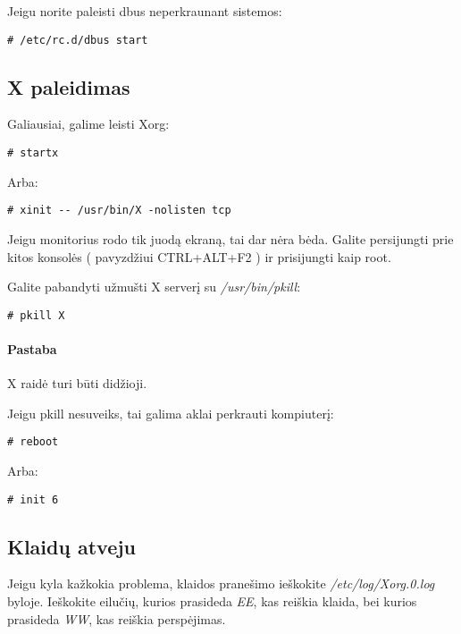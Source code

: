       Jeigu norite paleisti dbus neperkraunant sistemos:

      \begin{verbatim}
# /etc/rc.d/dbus start
      \end{verbatim}

    \subsection{X paleidimas}

      Galiausiai, galime leisti Xorg:

      \begin{verbatim}
# startx
      \end{verbatim}

      Arba:

      \begin{verbatim}
# xinit -- /usr/bin/X -nolisten tcp
      \end{verbatim}

      Jeigu monitorius rodo tik juodą ekraną, tai dar nėra
      bėda. Galite persijungti prie kitos konsolės ( pavyzdžiui
      CTRL+ALT+F2 ) ir prisijungti kaip root.

      Galite pabandyti užmušti X serverį su \textsl{/usr/bin/pkill}:

      \begin{verbatim}
# pkill X
      \end{verbatim}

      \paragraph{Pastaba} X raidė turi būti didžioji.

      Jeigu pkill nesuveiks, tai galima aklai perkrauti kompiuterį:

      \begin{verbatim}
# reboot
      \end{verbatim}

      Arba:
      
      \begin{verbatim}
# init 6
      \end{verbatim}

    \subsection{Klaidų atveju}

      Jeigu kyla kažkokia problema, klaidos pranešimo ieškokite
      \textsl{/etc/log/Xorg.0.log} byloje. Ieškokite eilučių, kurios
      prasideda \textsl{EE}, kas reiškia klaida, bei kurios prasideda
      \textsl{WW}, kas reiškia perspėjimas.

